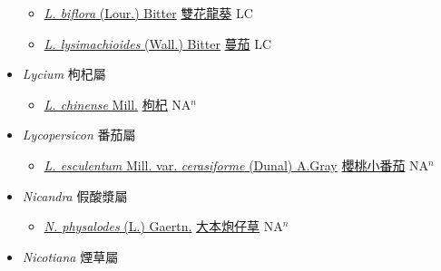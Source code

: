 \begin{itemize}
  \begin{itemize}
        \item[] \href{http://www.theplantlist.org/tpl1.1/search?q=Lycianthes+biflora}{\textit{L. biflora} (Lour.) Bitter}   \href{\detokenize{http://taibnet.sinica.edu.tw/chi/taibnet_species_list.php?T2=雙花龍葵&T2_new_value=true&fr=y}}{雙花龍葵} LC
        \item[] \href{http://www.theplantlist.org/tpl1.1/search?q=Lycianthes+lysimachioides}{\textit{L. lysimachioides} (Wall.) Bitter}   \href{\detokenize{http://taibnet.sinica.edu.tw/chi/taibnet_species_list.php?T2=蔓茄&T2_new_value=true&fr=y}}{蔓茄} LC
  \end{itemize}
 \item[] \textit{Lycium} 枸杞屬
                    
  \begin{itemize}
        \item[] \href{http://www.theplantlist.org/tpl1.1/search?q=Lycium+chinense}{\textit{L. chinense} Mill.}   \href{\detokenize{http://taibnet.sinica.edu.tw/chi/taibnet_species_list.php?T2=枸杞&T2_new_value=true&fr=y}}{枸杞} NA$^n$
  \end{itemize}
 \item[] \textit{Lycopersicon} 番茄屬
                    
  \begin{itemize}
        \item[] \href{http://www.theplantlist.org/tpl1.1/search?q=Lycopersicon+esculentum+var.+cerasiforme}{\textit{L. esculentum} Mill. var. \textit{cerasiforme} (Dunal) A.Gray}   \href{\detokenize{http://taibnet.sinica.edu.tw/chi/taibnet_species_list.php?T2=櫻桃小番茄&T2_new_value=true&fr=y}}{櫻桃小番茄} NA$^n$
  \end{itemize}
 \item[] \textit{Nicandra} 假酸漿屬
                    
  \begin{itemize}
        \item[] \href{http://www.theplantlist.org/tpl1.1/search?q=Nicandra+physalodes}{\textit{N. physalodes} (L.) Gaertn.}   \href{\detokenize{http://taibnet.sinica.edu.tw/chi/taibnet_species_list.php?T2=大本炮仔草&T2_new_value=true&fr=y}}{大本炮仔草} NA$^n$
  \end{itemize}
 \item[] \textit{Nicotiana} 煙草屬
                    

\end{itemize}
